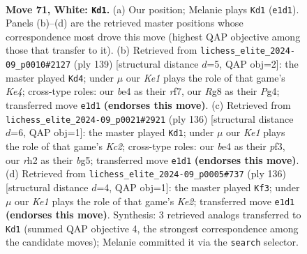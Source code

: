 \documentclass[11pt]{article}
\begin{document}
\clearpage

\begin{figure}[p]\centering
\begin{subfigure}{0.46\textwidth}\centering
\resizebox{\linewidth}{!}{%
\newchessgame
\chessboard[
  setfen={6R1/5R2/3k4/8/1P2b3/8/7r/4K3 w - - 15 71},
  showmover=false,
  pgfstyle=straightmove, color=movearrow, markmove={e1-d1}
]}
\caption{}
\end{subfigure}\hfill
\begin{subfigure}{0.46\textwidth}\centering
\resizebox{\linewidth}{!}{%
\newchessgame
\chessboard[
  setfen={8/5R2/1R6/4k3/6p1/8/7r/2K5 b - - 1 70},
  showmover=false,
  pgfstyle=straightmove, color=movearrow, markmove={e5-d4}
]}
\caption{}
\end{subfigure}
\\[4pt]
\begin{subfigure}{0.46\textwidth}\centering
\resizebox{\linewidth}{!}{%
\newchessgame
\chessboard[
  setfen={8/8/4R3/6b1/3k4/P4p2/2K5/8 w - - 2 69},
  showmover=false,
  pgfstyle=straightmove, color=movearrow, markmove={c2-d1}
]}
\caption{}
\end{subfigure}\hfill
\begin{subfigure}{0.46\textwidth}\centering
\resizebox{\linewidth}{!}{%
\newchessgame
\chessboard[
  setfen={8/5k2/R7/2b2P2/6r1/8/4K3/8 w - - 0 69},
  showmover=false,
  pgfstyle=straightmove, color=movearrow, markmove={e2-f3}
]}
\caption{}
\end{subfigure}
\caption{\textbf{Move 71, White: \texttt{Kd1}.} (a) Our position; Melanie plays \texttt{Kd1} (\texttt{e1d1}). Panels (b)--(d) are the retrieved master positions whose correspondence most drove this move (highest QAP objective among those that transfer to it). (b) Retrieved from \texttt{lichess\_elite\_2024-09\_p0010\#2127} (ply 139) [structural distance $d$=5, QAP obj=2]: the master played \texttt{Kd4}; under $\mu$ our \emph{Ke1} plays the role of that game's \emph{Ke4}; cross-type roles: our \emph{b}e4 as their \emph{r}f7, our \emph{R}g8 as their \emph{P}g4; transferred move \texttt{e1d1} \textbf{(endorses this move)}. (c) Retrieved from \texttt{lichess\_elite\_2024-09\_p0021\#2921} (ply 136) [structural distance $d$=6, QAP obj=1]: the master played \texttt{Kd1}; under $\mu$ our \emph{Ke1} plays the role of that game's \emph{Kc2}; cross-type roles: our \emph{b}e4 as their \emph{p}f3, our \emph{r}h2 as their \emph{b}g5; transferred move \texttt{e1d1} \textbf{(endorses this move)}. (d) Retrieved from \texttt{lichess\_elite\_2024-09\_p0005\#737} (ply 136) [structural distance $d$=4, QAP obj=1]: the master played \texttt{Kf3}; under $\mu$ our \emph{Ke1} plays the role of that game's \emph{Ke2}; transferred move \texttt{e1d1} \textbf{(endorses this move)}. Synthesis: 3 retrieved analogs transferred to \texttt{Kd1} (summed QAP objective 4, the strongest correspondence among the candidate moves); Melanie committed it via the \texttt{search} selector.}
\label{fig:thought-m140}
\end{figure}
\end{document}
